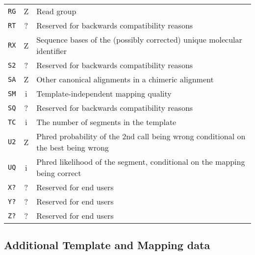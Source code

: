 \documentclass[10pt]{article}
\begin{document}
\begin{center}
\begin{longtable}{ccp{12.5cm}}
  {\tt RG} & Z & Read group \\
  {\tt RT} & ? & Reserved for backwards compatibility reasons \\
  {\tt RX} & Z & Sequence bases of the (possibly corrected) unique molecular identifier \\
  {\tt S2} & ? & Reserved for backwards compatibility reasons \\
  {\tt SA} & Z & Other canonical alignments in a chimeric alignment \\
  {\tt SM} & i & Template-independent mapping quality \\
  {\tt SQ} & ? & Reserved for backwards compatibility reasons \\
  {\tt TC} & i & The number of segments in the template \\
  {\tt U2} & Z & Phred probability of the 2nd call being wrong conditional on the best being wrong \\
  {\tt UQ} & i & Phred likelihood of the segment, conditional on the mapping being correct \\
  {\tt X?} & ? & Reserved for end users \\
  {\tt Y?} & ? & Reserved for end users \\
  {\tt Z?} & ? & Reserved for end users \\
  \hline
\end{longtable}
\end{center}

\subsection{Additional Template and Mapping data}
\end{document}

